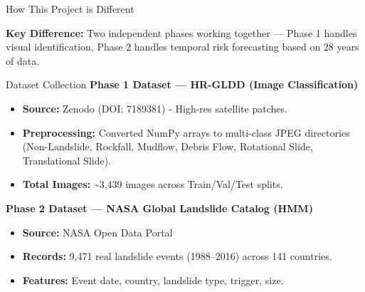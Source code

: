 \documentclass[11pt]{beamer}
\begin{document}
\begin{frame}{How This Project is Different}
    \begin{table}[]
        \centering
    \end{table}
    \vspace{0.3cm}
    \textbf{Key Difference:} Two independent phases working together — Phase 1 handles visual identification, Phase 2 handles temporal risk forecasting based on 28 years of data.
\end{frame}

\begin{frame}{Dataset Collection}
    \textbf{Phase 1 Dataset — HR-GLDD (Image Classification)}
    \begin{itemize}
        \item \textbf{Source:} Zenodo (DOI: 7189381) - High-res satellite patches.
        \item \textbf{Preprocessing:} Converted NumPy arrays to multi-class JPEG directories (Non-Landslide, Rockfall, Mudflow, Debris Flow, Rotational Slide, Translational Slide).
        \item \textbf{Total Images:} \textasciitilde 3,439 images across Train/Val/Test splits.
    \end{itemize}
    \vspace{0.3cm}
    \textbf{Phase 2 Dataset — NASA Global Landslide Catalog (HMM)}
    \begin{itemize}
        \item \textbf{Source:} NASA Open Data Portal
        \item \textbf{Records:} 9,471 real landslide events (1988–2016) across 141 countries.
        \item \textbf{Features:} Event date, country, landslide type, trigger, size.
    \end{itemize}
\end{frame}
\end{document}
